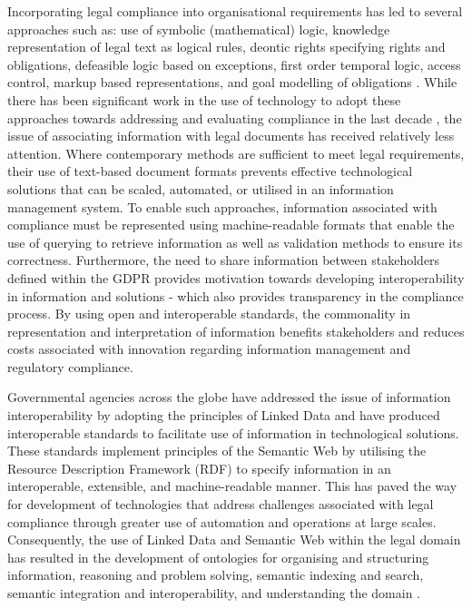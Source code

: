 Incorporating legal compliance into organisational requirements has led to several approaches such as: use of symbolic (mathematical) logic, knowledge representation of legal text as logical rules, deontic rights specifying rights and obligations, defeasible logic based on exceptions, first order temporal logic, access control, markup based representations, and goal modelling of obligations \cite{otto_addressing_2007}.
While there has been significant work in the use of technology to adopt these approaches towards addressing and evaluating compliance in the last decade \cite{sadiq_modeling_2007,otto_addressing_2007,gordon_rules_2009,fellmann_state---art_2014,benyoucef_information_2015,elgammal_formalizing_2016,kirrane_access_2016}, the issue of associating information with legal documents has received relatively less attention.
Where contemporary methods are sufficient to meet legal requirements, their use of text-based document formats prevents effective technological solutions that can be scaled, automated, or utilised in an information management system. To enable such approaches, information associated with compliance must be represented using machine-readable formats that enable the use of querying to retrieve information as well as validation methods to ensure its correctness. Furthermore, the need to share information between stakeholders defined within the GDPR provides motivation towards developing interoperability in information and solutions - which also provides transparency in the compliance process. By using open and interoperable standards, the commonality in representation and interpretation of information benefits stakeholders and reduces costs associated with innovation regarding information management and regulatory compliance.

Governmental agencies across the globe have addressed the issue of information interoperability by adopting the principles of Linked Data \cite{bizer_linked_2011} and have produced interoperable standards \cite{palmirani_akoma_2018,european_union_eli_2015,van_opijnen_european_2011} to facilitate use of information in technological solutions.
These standards implement principles of the Semantic Web \cite{semantic-web} by utilising the Resource Description Framework (RDF) \cite{RDF} to specify information in an interoperable, extensible, and machine-readable manner.
This has paved the way for development of technologies that address challenges associated with legal compliance through greater use of automation and operations at large scales.
Consequently, the use of Linked Data and Semantic Web within the legal domain has resulted in the development of ontologies for organising and structuring information, reasoning and problem solving, semantic indexing and search, semantic integration and interoperability, and understanding the domain \cite{rodrigues_legal_2019}.

